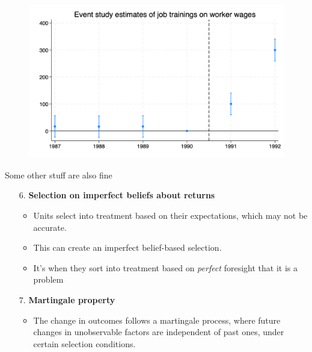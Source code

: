 \documentclass{beamer}
\begin{document}
\begin{frame}
 
\begin{figure}
    \centering
    \includegraphics[width=\textwidth]{./lecture_includes/dip_es}
\end{figure}

\end{frame}


\begin{frame}{Some other stuff are also fine}
\begin{enumerate}
    
    \item[6. ] \textbf{Selection on imperfect beliefs about returns}
    \begin{itemize}
        \item Units select into treatment based on their expectations, which may not be accurate. 
        \item This can create an imperfect belief-based selection.
        \item It's when they sort into treatment based on \emph{perfect} foresight that it is a problem
    \end{itemize}
    
    \item[7. ] \textbf{Martingale property}
    \begin{itemize}
        \item The change in outcomes follows a martingale process, where future changes in unobservable factors are independent of past ones, under certain selection conditions.
    \end{itemize}
\end{enumerate}
\end{frame}
\end{document}
